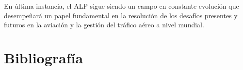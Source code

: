 \documentclass[letter, 10pt]{article}
\begin{document}
En \'ultima instancia, el ALP sigue siendo un campo en constante evoluci\'on que desempe\~{n}ar\'a un papel fundamental en la resoluci\'on de los desaf\'ios presentes y futuros en la aviaci\'on y la gesti\'on del tr\'afico a\'ereo a nivel mundial.


\section{Bibliograf\'ia}
\begin{comment}
Indicando toda la informaci\'on necesaria de acuerdo al tipo de documento revisado. Todas las referencias deben ser citadas en el documento.
\end{comment}



\end{document}
